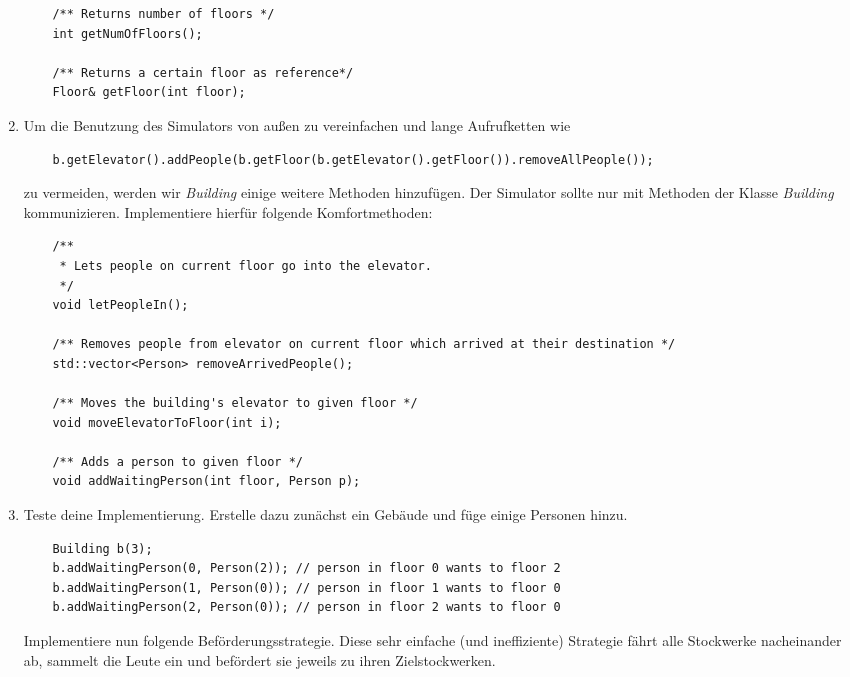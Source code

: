 \documentclass[
  accentcolor=tud1c,	%
  colorbacktitle,		%
  inverttitle,			%
  german,				%
  twoside
]{tudexercise}
\begin{document}
\begin{enumerate}
\begin{lstlisting}
	/** Returns number of floors */
	int getNumOfFloors();
	
	/** Returns a certain floor as reference*/
	Floor& getFloor(int floor);
\end{lstlisting}


\item 
Um die Benutzung des Simulators von außen zu vereinfachen und lange Aufrufketten wie
\begin{lstlisting}
	b.getElevator().addPeople(b.getFloor(b.getElevator().getFloor()).removeAllPeople());
\end{lstlisting} 

zu vermeiden, werden wir \emph{Building} einige weitere Methoden hinzufügen.
Der Simulator sollte nur mit Methoden der Klasse \emph{Building} kommunizieren.
Implementiere hierfür folgende Komfortmethoden:

\begin{lstlisting}
	/** 
	 * Lets people on current floor go into the elevator.
	 */
	void letPeopleIn();
	
	/** Removes people from elevator on current floor which arrived at their destination */
	std::vector<Person> removeArrivedPeople();
	
	/** Moves the building's elevator to given floor */
	void moveElevatorToFloor(int i);
	
	/** Adds a person to given floor */
	void addWaitingPerson(int floor, Person p);
\end{lstlisting}	

\item
Teste deine Implementierung.
Erstelle dazu zunächst ein Gebäude und füge einige Personen hinzu.

\begin{lstlisting}
	Building b(3);
	b.addWaitingPerson(0, Person(2)); // person in floor 0 wants to floor 2
	b.addWaitingPerson(1, Person(0)); // person in floor 1 wants to floor 0
	b.addWaitingPerson(2, Person(0)); // person in floor 2 wants to floor 0
\end{lstlisting}

Implementiere nun folgende Beförderungsstrategie.
Diese sehr einfache (und ineffiziente) Strategie fährt alle Stockwerke nacheinander ab, sammelt die Leute ein und befördert sie jeweils zu ihren Zielstockwerken.

\begin{algorithm}[H]
 \SetAlgoLined
\end{algorithm}
\end{enumerate}
\end{document}
